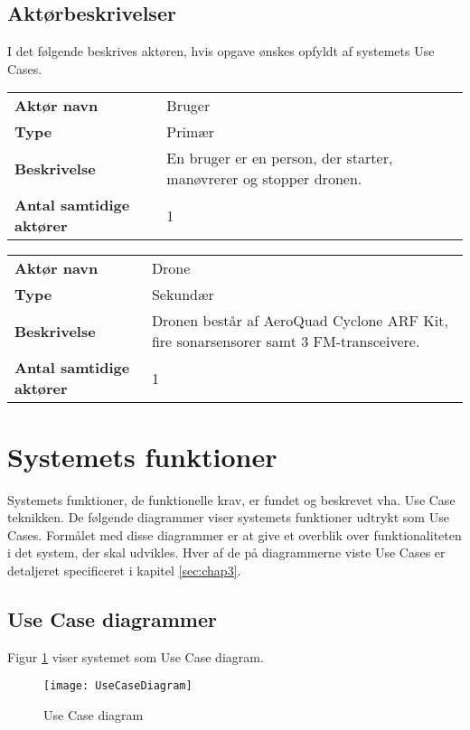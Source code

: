 \documentclass[Main]{subfiles}
\begin{document}
\subsection{Aktørbeskrivelser}
I det følgende beskrives aktøren, hvis opgave ønskes opfyldt af systemets Use Cases. 

\begin{longtable}{p{}|p{}}
\hline
\textbf{Aktør navn}  				& Bruger \\
\textbf{Type} 						& Primær \\
\textbf{Beskrivelse} 				& En bruger er en person, der starter, manøvrerer og stopper dronen. \\
\textbf{Antal samtidige aktører} 	& 1 \\
\hline
\end{longtable}

\begin{longtable}{p{}|p{}}
\hline
\textbf{Aktør navn}  				& Drone \\
\textbf{Type} 						& Sekundær \\
\textbf{Beskrivelse} 				& Dronen består af AeroQuad Cyclone ARF Kit, fire sonarsensorer samt 3 FM-transceivere. \\
\textbf{Antal samtidige aktører} 	& 1 \\
\hline
\end{longtable}


\section{Systemets funktioner}
Systemets funktioner, de funktionelle krav, er fundet og beskrevet vha. Use Case teknikken. 
De følgende diagrammer viser systemets funktioner udtrykt som Use Cases. 
Formålet med disse diagrammer er at give et overblik over funktionaliteten i det system, der skal udvikles. 
Hver af de på diagrammerne viste Use Cases er detaljeret specificeret i kapitel \ref{sec:chap3}.



\subsection{Use Case diagrammer}
Figur \ref{Fig:UC-Diagram} viser systemet som Use Case diagram.

\begin{figure}[hbtp]
\centering
\texttt{[image: UseCaseDiagram]}
\caption{Use Case diagram}
\label{Fig:UC-Diagram}
\end{figure}
\end{document}
